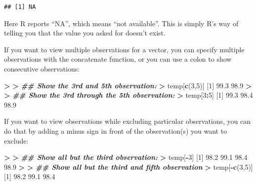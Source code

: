 \documentclass[
]{book}
\newenvironment{Shaded}{\begin{snugshade}}{\end{snugshade}}
\newcommand{\DecValTok}[1]{\textcolor[rgb]{0.00,0.00,0.81}{#1}}
\newcommand{\DocumentationTok}[1]{\textcolor[rgb]{0.56,0.35,0.01}{\textbf{\textit{#1}}}}
\newcommand{\ErrorTok}[1]{\textcolor[rgb]{0.64,0.00,0.00}{\textbf{#1}}}
\newcommand{\FloatTok}[1]{\textcolor[rgb]{0.00,0.00,0.81}{#1}}
\newcommand{\FunctionTok}[1]{\textcolor[rgb]{0.13,0.29,0.53}{\textbf{#1}}}
\newcommand{\NormalTok}[1]{#1}
\newcommand{\SpecialCharTok}[1]{\textcolor[rgb]{0.81,0.36,0.00}{\textbf{#1}}}
\begin{document}
\begin{verbatim}
## [1] NA
\end{verbatim}

Here R reports ``NA'', which means ``not available''. This is simply R's way of telling you that the value you asked for doesn't exist.

If you want to view multiple observations for a vector, you can specify multiple observations with the concatenate function, or you can use a colon to show consecutive observations:

\begin{Shaded}
\begin{Highlighting}[]
\SpecialCharTok{\textgreater{}} 
\ErrorTok{\textgreater{}} \DocumentationTok{\#\# Show the 3rd and 5th observation:}
\ErrorTok{\textgreater{}}\NormalTok{ temp[}\FunctionTok{c}\NormalTok{(}\DecValTok{3}\NormalTok{,}\DecValTok{5}\NormalTok{)]}
\NormalTok{[}\DecValTok{1}\NormalTok{] }\FloatTok{99.3} \FloatTok{98.9}
\SpecialCharTok{\textgreater{}} 
\ErrorTok{\textgreater{}} \DocumentationTok{\#\# Show the 3rd through the 5th observation:}
\ErrorTok{\textgreater{}}\NormalTok{ temp[}\DecValTok{3}\SpecialCharTok{:}\DecValTok{5}\NormalTok{]}
\NormalTok{[}\DecValTok{1}\NormalTok{] }\FloatTok{99.3} \FloatTok{98.4} \FloatTok{98.9}
\end{Highlighting}
\end{Shaded}

If you want to view observations while excluding particular observations, you can do that by adding a minus sign in front of the observation(s) you want to exclude:

\begin{Shaded}
\begin{Highlighting}[]
\SpecialCharTok{\textgreater{}} 
\ErrorTok{\textgreater{}} \DocumentationTok{\#\# Show all but the third observation:}
\ErrorTok{\textgreater{}}\NormalTok{ temp[}\SpecialCharTok{{-}}\DecValTok{3}\NormalTok{]}
\NormalTok{[}\DecValTok{1}\NormalTok{] }\FloatTok{98.2} \FloatTok{99.1} \FloatTok{98.4} \FloatTok{98.9}
\SpecialCharTok{\textgreater{}} 
\ErrorTok{\textgreater{}} \DocumentationTok{\#\# Show all but the third and fifth observation}
\ErrorTok{\textgreater{}}\NormalTok{ temp[}\SpecialCharTok{{-}}\FunctionTok{c}\NormalTok{(}\DecValTok{3}\NormalTok{,}\DecValTok{5}\NormalTok{)]}
\NormalTok{[}\DecValTok{1}\NormalTok{] }\FloatTok{98.2} \FloatTok{99.1} \FloatTok{98.4}
\end{Highlighting}
\end{Shaded}
\end{document}
